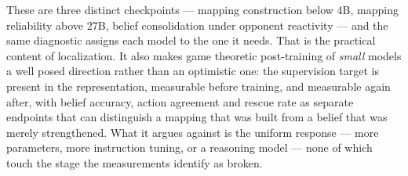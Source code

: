 These are three distinct checkpoints --- mapping construction below 4B, mapping
reliability above 27B, belief consolidation under opponent reactivity --- and
the same diagnostic assigns each model to the one it needs. That is the
practical content of localization. It also makes game theoretic post-training
of \emph{small} models a well posed direction rather than an optimistic one:
the supervision target is present in the representation, measurable before
training, and measurable again after, with belief accuracy, action agreement
and rescue rate as separate endpoints that can distinguish a mapping that was
built from a belief that was merely strengthened. What it argues against is the
uniform response --- more parameters, more instruction tuning, or a reasoning
model --- none of which touch the stage the measurements identify as broken.
